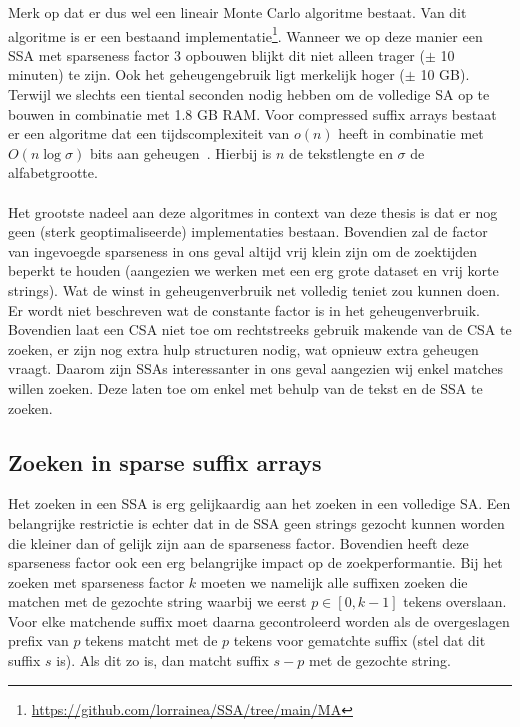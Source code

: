 Merk op dat er dus wel een lineair Monte Carlo algoritme bestaat.
Van dit algoritme is er een bestaand implementatie\footnote{\url{https://github.com/lorrainea/SSA/tree/main/MA}}.
Wanneer we op deze manier een SSA met sparseness factor 3 opbouwen blijkt dit niet alleen trager ($\pm$ 10 minuten) te zijn.
Ook het geheugengebruik ligt merkelijk hoger ($\pm$ 10 GB).
Terwijl we slechts een tiental seconden nodig hebben om de volledige SA op te bouwen in combinatie met 1.8 GB RAM\@.
Voor compressed suffix arrays bestaat er een algoritme dat een tijdscomplexiteit van $o(n)$ heeft in combinatie met $O(n \log \sigma)$ bits aan geheugen~\cite{building_compressed_sa}.
Hierbij is $n$ de tekstlengte en $\sigma$ de alfabetgrootte.
\\ \\
Het grootste nadeel aan deze algoritmes in context van deze thesis is dat er nog geen (sterk geoptimaliseerde) implementaties bestaan.
Bovendien zal de factor van ingevoegde sparseness in ons geval altijd vrij klein zijn om de zoektijden beperkt te houden (aangezien we werken met een erg grote dataset en vrij korte strings).
Wat de winst in geheugenverbruik net volledig teniet zou kunnen doen.
Er wordt niet beschreven wat de constante factor is in het geheugenverbruik.
Bovendien laat een CSA niet toe om rechtstreeks gebruik makende van de CSA te zoeken, er zijn nog extra hulp structuren nodig, wat opnieuw extra geheugen vraagt.
Daarom zijn SSAs interessanter in ons geval aangezien wij enkel matches willen zoeken.
Deze laten toe om enkel met behulp van de tekst en de SSA te zoeken.

\subsection{Zoeken in sparse suffix arrays}
Het zoeken in een SSA is erg gelijkaardig aan het zoeken in een volledige SA\@.
Een belangrijke restrictie is echter dat in de SSA geen strings gezocht kunnen worden die kleiner dan of gelijk zijn aan de sparseness factor.
Bovendien heeft deze sparseness factor ook een erg belangrijke impact op de zoekperformantie.
Bij het zoeken met sparseness factor $k$ moeten we namelijk alle suffixen zoeken die matchen met de gezochte string waarbij we eerst $p \in [0, k-1]$ tekens overslaan.
Voor elke matchende suffix moet daarna gecontroleerd worden als de overgeslagen prefix van $p$ tekens matcht met de $p$ tekens voor gematchte suffix (stel dat dit suffix $s$ is).
Als dit zo is, dan matcht suffix $s-p$ met de gezochte string.

